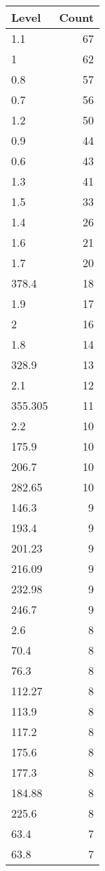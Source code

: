 \begin{table}[ht]
\centering
\begin{tabular}{lr}
  \hline
Level & Count \\ 
  \hline
1.1 &  67 \\ 
  1 &  62 \\ 
  0.8 &  57 \\ 
  0.7 &  56 \\ 
  1.2 &  50 \\ 
  0.9 &  44 \\ 
  0.6 &  43 \\ 
  1.3 &  41 \\ 
  1.5 &  33 \\ 
  1.4 &  26 \\ 
  1.6 &  21 \\ 
  1.7 &  20 \\ 
  378.4 &  18 \\ 
  1.9 &  17 \\ 
  2 &  16 \\ 
  1.8 &  14 \\ 
  328.9 &  13 \\ 
  2.1 &  12 \\ 
  355.305 &  11 \\ 
  2.2 &  10 \\ 
  175.9 &  10 \\ 
  206.7 &  10 \\ 
  282.65 &  10 \\ 
  146.3 &   9 \\ 
  193.4 &   9 \\ 
  201.23 &   9 \\ 
  216.09 &   9 \\ 
  232.98 &   9 \\ 
  246.7 &   9 \\ 
  2.6 &   8 \\ 
  70.4 &   8 \\ 
  76.3 &   8 \\ 
  112.27 &   8 \\ 
  113.9 &   8 \\ 
  117.2 &   8 \\ 
  175.6 &   8 \\ 
  177.3 &   8 \\ 
  184.88 &   8 \\ 
  225.6 &   8 \\ 
  63.4 &   7 \\ 
  63.8 &   7 \\ 

\end{tabular}
\end{table}
